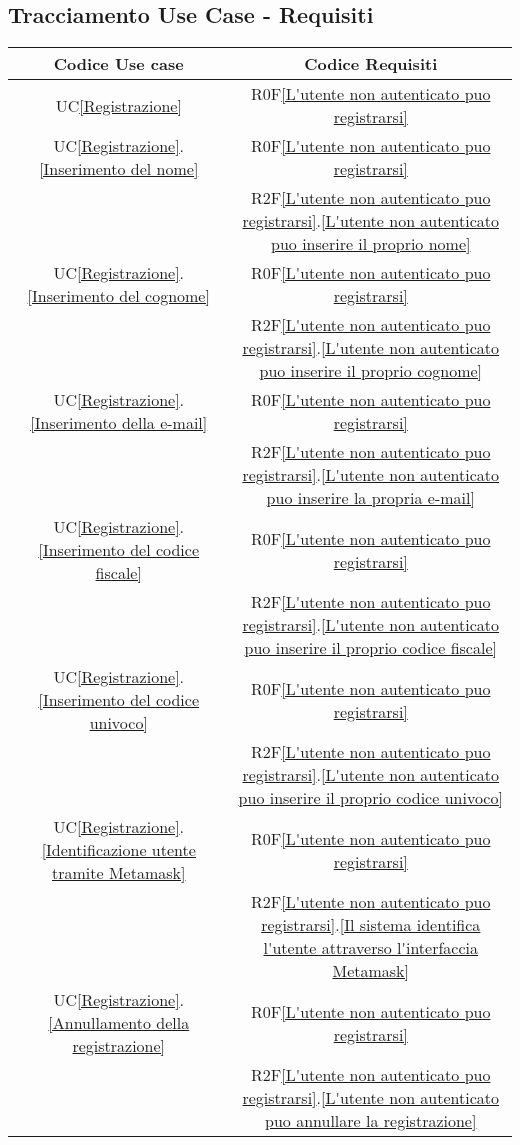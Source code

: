 \subsection{Tracciamento Use Case - Requisiti}
\normalsize
\begin{longtable}{|c|c|}
\hline
\textbf{Codice Use case} & \textbf{Codice Requisiti} \\
\hline
\endhead
UC\ref{Registrazione} & R0F\ref{L'utente non autenticato puo registrarsi}\\
\hline
UC\ref{Registrazione}.\ref{Inserimento del nome} & R0F\ref{L'utente non autenticato puo registrarsi}\\
& R2F\ref{L'utente non autenticato puo registrarsi}.\ref{L'utente non autenticato puo inserire il proprio nome}\\
\hline
UC\ref{Registrazione}.\ref{Inserimento del cognome} & R0F\ref{L'utente non autenticato puo registrarsi}\\
& R2F\ref{L'utente non autenticato puo registrarsi}.\ref{L'utente non autenticato puo inserire il proprio cognome}\\
\hline
UC\ref{Registrazione}.\ref{Inserimento della e-mail} & R0F\ref{L'utente non autenticato puo registrarsi}\\
& R2F\ref{L'utente non autenticato puo registrarsi}.\ref{L'utente non autenticato puo inserire la propria e-mail}\\
\hline
UC\ref{Registrazione}.\ref{Inserimento del codice fiscale} & R0F\ref{L'utente non autenticato puo registrarsi}\\
& R2F\ref{L'utente non autenticato puo registrarsi}.\ref{L'utente non autenticato puo inserire il proprio codice fiscale}\\
\hline
UC\ref{Registrazione}.\ref{Inserimento del codice univoco} & R0F\ref{L'utente non autenticato puo registrarsi}\\
& R2F\ref{L'utente non autenticato puo registrarsi}.\ref{L'utente non autenticato puo inserire il proprio codice univoco}\\
\hline
UC\ref{Registrazione}.\ref{Identificazione utente tramite Metamask} & R0F\ref{L'utente non autenticato puo registrarsi}\\
& R2F\ref{L'utente non autenticato puo registrarsi}.\ref{Il sistema identifica l'utente attraverso l'interfaccia Metamask}\\
\hline
UC\ref{Registrazione}.\ref{Annullamento della registrazione} & R0F\ref{L'utente non autenticato puo registrarsi}\\
& R2F\ref{L'utente non autenticato puo registrarsi}.\ref{L'utente non autenticato puo annullare la registrazione}\\

\end{longtable}
